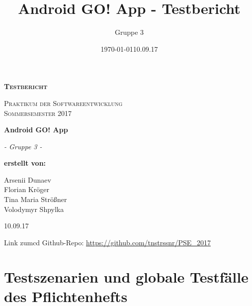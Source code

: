 \documentclass[11pt,a4paper]{scrartcl}
\date{\today}
\title{Android GO! App - Testbericht}
\author{Gruppe 3}
\date{10.09.17}
\begin{document}
\begin{titlepage}
	\begin{center}
	{\scshape\LARGE \bfseries Testbericht \par}
	\vspace{1cm}
	{\scshape\Large Praktikum der Softwareentwicklung \\ Sommersemester 2017\par}
	\vspace{1.5cm}
	{\huge\bfseries Android GO! App\par}
	\vspace{2cm}
	{\Large\itshape - Gruppe 3 -\par}
	\vfill
	{\bfseries erstellt von:\par}
	Arsenii Dunaev \\
	Florian Kröger \\
	Tina Maria Strößner \\
	Volodymyr Shpylka \\	
	\vfill
	{\large 10.09.17 \par}	
	\end{center}
\end{titlepage}

\newpage

\tableofcontents

\newpage
Link zumcd  Github-Repo: \url{https://github.com/tnstrssnr/PSE_2017}

\section{Testszenarien und globale Testfälle des Pflichtenhefts}
\end{document}
